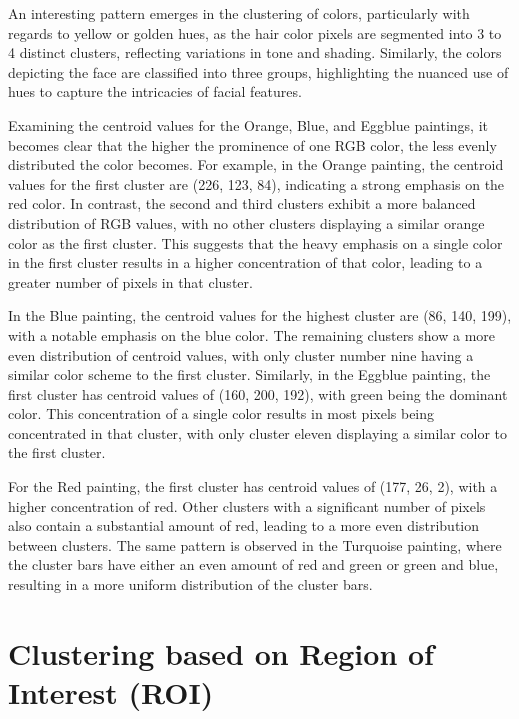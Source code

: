 \documentclass{article}
\begin{document}
An interesting pattern emerges in the clustering of colors, particularly
with regards to yellow or golden hues, as the hair color pixels are
segmented into 3 to 4 distinct clusters, reflecting variations in tone
and shading. Similarly, the colors depicting the face are classified
into three groups, highlighting the nuanced use of hues to capture the
intricacies of facial features.

Examining the centroid values for the Orange, Blue, and Eggblue
paintings, it becomes clear that the higher the prominence of one RGB
color, the less evenly distributed the color becomes. For example, in
the Orange painting, the centroid values for the first cluster are (226,
123, 84), indicating a strong emphasis on the red color. In contrast,
the second and third clusters exhibit a more balanced distribution of
RGB values, with no other clusters displaying a similar orange color as
the first cluster. This suggests that the heavy emphasis on a single
color in the first cluster results in a higher concentration of that
color, leading to a greater number of pixels in that cluster.

In the Blue painting, the centroid values for the highest cluster are
(86, 140, 199), with a notable emphasis on the blue color. The remaining
clusters show a more even distribution of centroid values, with only
cluster number nine having a similar color scheme to the first cluster.
Similarly, in the Eggblue painting, the first cluster has centroid
values of (160, 200, 192), with green being the dominant color. This
concentration of a single color results in most pixels being
concentrated in that cluster, with only cluster eleven displaying a
similar color to the first cluster.

For the Red painting, the first cluster has centroid values of (177, 26,
2), with a higher concentration of red. Other clusters with a
significant number of pixels also contain a substantial amount of red,
leading to a more even distribution between clusters. The same pattern
is observed in the Turquoise painting, where the cluster bars have
either an even amount of red and green or green and blue, resulting in a
more uniform distribution of the cluster bars.

\hypertarget{clustering-based-on-region-of-interest-roi}{%
\section{Clustering based on Region of Interest
(ROI)}\label{clustering-based-on-region-of-interest-roi}}
\end{document}
